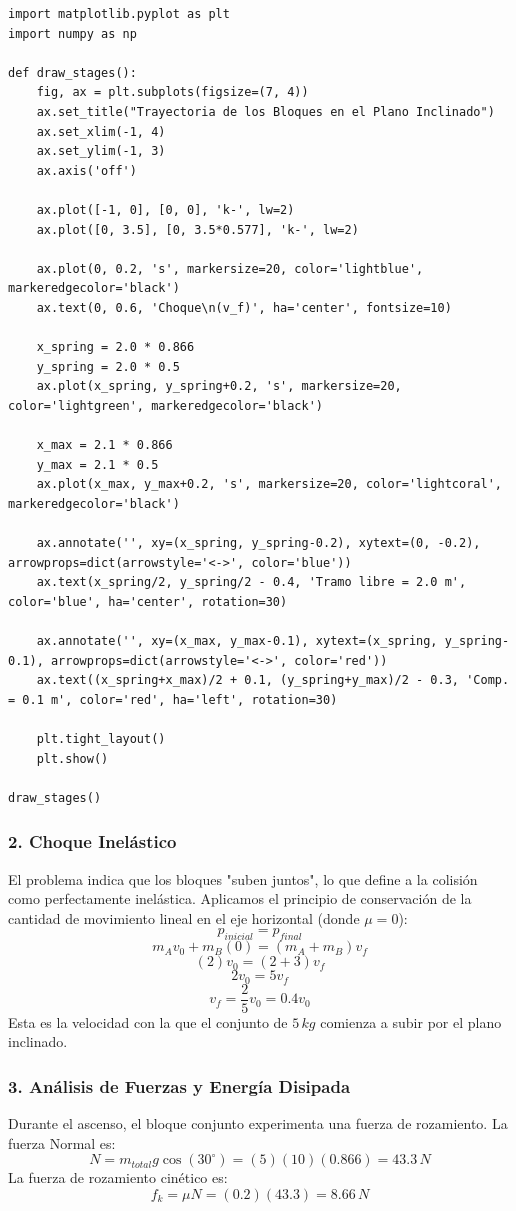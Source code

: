 \documentclass[12pt, a4paper]{article}
\begin{document}
\begin{lstlisting}
import matplotlib.pyplot as plt
import numpy as np

def draw_stages():
    fig, ax = plt.subplots(figsize=(7, 4))
    ax.set_title("Trayectoria de los Bloques en el Plano Inclinado")
    ax.set_xlim(-1, 4)
    ax.set_ylim(-1, 3)
    ax.axis('off')

    ax.plot([-1, 0], [0, 0], 'k-', lw=2)
    ax.plot([0, 3.5], [0, 3.5*0.577], 'k-', lw=2)

    ax.plot(0, 0.2, 's', markersize=20, color='lightblue', markeredgecolor='black')
    ax.text(0, 0.6, 'Choque\n(v_f)', ha='center', fontsize=10)

    x_spring = 2.0 * 0.866
    y_spring = 2.0 * 0.5
    ax.plot(x_spring, y_spring+0.2, 's', markersize=20, color='lightgreen', markeredgecolor='black')

    x_max = 2.1 * 0.866
    y_max = 2.1 * 0.5
    ax.plot(x_max, y_max+0.2, 's', markersize=20, color='lightcoral', markeredgecolor='black')

    ax.annotate('', xy=(x_spring, y_spring-0.2), xytext=(0, -0.2), arrowprops=dict(arrowstyle='<->', color='blue'))
    ax.text(x_spring/2, y_spring/2 - 0.4, 'Tramo libre = 2.0 m', color='blue', ha='center', rotation=30)

    ax.annotate('', xy=(x_max, y_max-0.1), xytext=(x_spring, y_spring-0.1), arrowprops=dict(arrowstyle='<->', color='red'))
    ax.text((x_spring+x_max)/2 + 0.1, (y_spring+y_max)/2 - 0.3, 'Comp. = 0.1 m', color='red', ha='left', rotation=30)

    plt.tight_layout()
    plt.show()

draw_stages()
\end{lstlisting}

\subsubsection*{2. Choque Inelástico}
El problema indica que los bloques "suben juntos", lo que define a la colisión como perfectamente inelástica. Aplicamos el principio de conservación de la cantidad de movimiento lineal en el eje horizontal (donde $\mu = 0$):
$$ p_{inicial} = p_{final} $$
$$ m_A v_0 + m_B (0) = (m_A + m_B) v_f $$
$$ (2) v_0 = (2 + 3) v_f $$
$$ 2 v_0 = 5 v_f $$
$$ v_f = \frac{2}{5} v_0 = 0.4 v_0 $$
Esta es la velocidad con la que el conjunto de $5 \, \si{kg}$ comienza a subir por el plano inclinado.

\subsubsection*{3. Análisis de Fuerzas y Energía Disipada}
Durante el ascenso, el bloque conjunto experimenta una fuerza de rozamiento.
La fuerza Normal es:
$$ N = m_{total} g \cos(30^\circ) = (5)(10)(0.866) = 43.3 \, \si{N} $$
La fuerza de rozamiento cinético es:
$$ f_k = \mu N = (0.2)(43.3) = 8.66 \, \si{N} $$
\end{document}
